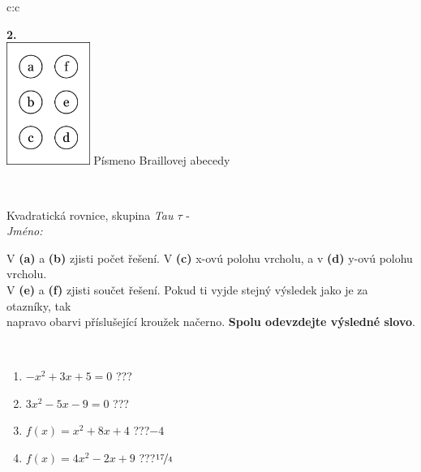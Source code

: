 \documentclass[10pt]{report}
\begin{document}
\begin{tabular}{c:c}
\begin{minipage}[c][104.5mm][t]{0.5\linewidth}
\begin{center}
\begin{minipage}{0.20\linewidth}
\begin{center}
{\Huge\bfseries 2.} \\[2mm]
\includegraphics[height=40mm]{../images/braille.png}
{\small Písmeno Braillovej abecedy}
\end{center}
\end{minipage}
\end{center}
\end{minipage}
\\ \hdashline
\begin{minipage}[c][104.5mm][t]{0.5\linewidth}
\begin{center}
\vspace{7mm}
{\huge Kvadratická rovnice, skupina \textit{Tau $\tau$} -}\\[5mm]
\textit{Jméno:}\phantom{xxxxxxxxxxxxxxxxxxxxxxxxxxxxxxxxxxxxxxxxxxxxxxxxxxxxxxxxxxxxxxxxx}\\[5mm]
\begin{minipage}{0.95\linewidth}
\begin{center}
V \textbf{(a)} a \textbf{(b)} zjisti počet řešení. V \textbf{(c)} x-ovú polohu vrcholu, a v \textbf{(d)} y-ovú polohu vrcholu.\\V \textbf{(e)} a \textbf{(f)} zjisti součet řešení. Pokud ti vyjde stejný výsledek jako je za otazníky, tak\\napravo obarvi příslušející kroužek načerno. \textbf{Spolu odevzdejte výsledné slovo}.
\end{center}
\end{minipage}
\\[1mm]
\begin{minipage}{0.79\linewidth}
\begin{center}
\begin{varwidth}{\linewidth}
\begin{enumerate}
\Large
\item $-x^2+3x+5=0$\quad \dotfill\; ???\;\dotfill {}
\item $3x^2-5x-9=0$\quad \dotfill\; ???\;\dotfill {}
\item $f(x)=x^2+8x+4$\quad \dotfill\; ???\;\dotfill \quad $-4$
\item $f(x)=4x^2-2x+9$\quad \dotfill\; ???\;\dotfill \quad $\nicefrac{17}{4}$

\end{enumerate}
\end{varwidth}
\end{center}
\end{minipage}
\end{center}
\end{minipage}
\end{tabular}
\end{document}
